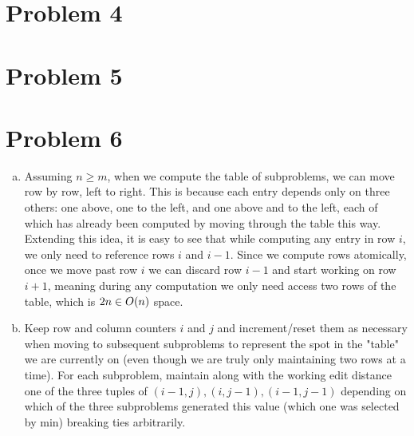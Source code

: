 \documentclass[11pt]{article}
\let\origleft\left
\let\origright\right
\renewcommand{\left}{\mathopen{}\mathclose\bgroup\origleft}
\renewcommand{\right}{\aftergroup\egroup\origright}
\newcommand{\p}[1]{\left(#1\right)}
\newcommand{\BigOh}[1]{O\p{#1}}
\begin{document}
\newpage
\section*{Problem 4}


\newpage
\section*{Problem 5}


\newpage
\section*{Problem 6}
\begin{enumerate}[(a)]
\item Assuming $n\geq m$, when we compute the table of subproblems, we can move row by row, left to right. This is because each entry depends only on three others: one above, one to the left, and one above and to the left, each of which has already been computed by moving through the table this way. Extending this idea, it is easy to see that while computing any entry in row $i$, we only need to reference rows $i$ and $i-1$. Since we compute rows atomically, once we move past row $i$ we can discard row $i-1$ and start working on row $i+1$, meaning during any computation we only need access two rows of the table, which is $2n \in \BigOh{n}$ space.
\item Keep row and column counters $i$ and $j$ and increment/reset them as necessary when moving to subsequent subproblems to represent the spot in the "table" we are currently on (even though we are truly only maintaining two rows at a time). For each subproblem, maintain along with the working edit distance one of the three tuples of $(i-1,j), (i,j-1), (i-1,j-1)$ depending on which of the three subproblems generated this value (which one was selected by min) breaking ties arbitrarily.
\end{enumerate}
\end{document}
